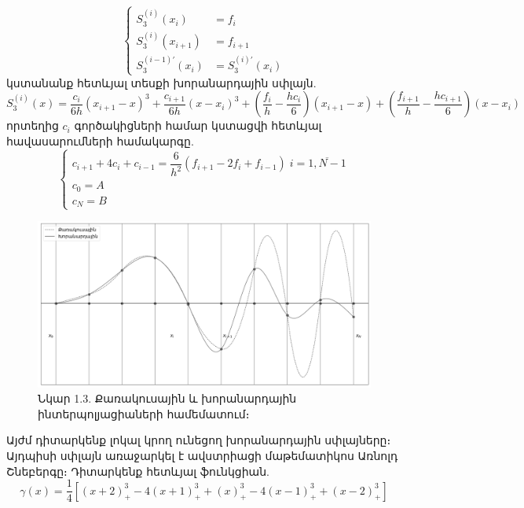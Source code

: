 \documentclass[fleqn, bachelor,subf,12pt,notitlepage]{article}
\begin{document}
\begin{equation}
\begin{cases}
				S_{3}^{(i)}(x_{i}) &=f_{i}\\
				S_{3}^{(i)}(x_{i+1}) &= f_{i+1}\\
				S_{3}^{(i-1)'}(x_{i}) &= S_{3}^{(i)'}(x_{i})

\end{cases}
\end{equation}
կստանանք հետևյալ տեսքի խորանարդային սփլայն.
\begin{equation}
	S_{3}^{(i)}(x) = \dfrac{c_{i}}{6h}\left(x_{i+1}-x\right)^{3}+\dfrac{c_{i+1}}{6h}\left(x-x_{i}\right)^{3}+\left(\dfrac{f_{i}}{h}-\dfrac{hc_{i}}{6}\right)\left(x_{i+1}-x\right)+\left(\dfrac{f_{i+1}}{h}-\dfrac{hc_{i+1}}{6}\right)\left(x-x_{i}\right)
\end{equation}
որտեղից $c_{i}$ գործակիցների համար կստացվի հետևյալ հավասարումների համակարգը.
\begin{equation}
\begin{cases}
c_{i+1}+4c_{i}+c_{i-1} = \dfrac{6}{h^2}\left(f_{i+1}-2f_{i}+f_{i-1}\right) \; i=\overline{1, N-1}\\
c_{0}=A\\
c_{N}=B
\end{cases}
\end{equation}
\begin{figure}[h!]
\centering
\includegraphics[width=1.0\textwidth]{images/quadratic_and_cubic_interploation}
\captionsetup{labelformat=empty}
\caption{\hfill Նկար 1.3. Քառակուսային և խորանարդային ինտերպոլյացիաների համեմատում։}
\end{figure}
\newpage
Այժմ դիտարկենք լոկալ կրող ունեցող խորանարդային սփլայները։ Այդպիսի սփլայն առաջարկել է ավստրիացի մաթեմատիկոս Առնոլդ Շնեբերգը։
Դիտարկենք հետևյալ ֆունկցիան.
\begin{equation}
\gamma(x)=\dfrac{1}{4}\left[\left(x+2\right)^{3}_{+} - 4\left(x+1\right)^{3}_{+}+ \left(x\right)^{3}_{+} -4\left(x-1\right)^{3}_{+} + \left(x-2\right)^{3}_{+}\right]
\end{equation}
\end{document}
